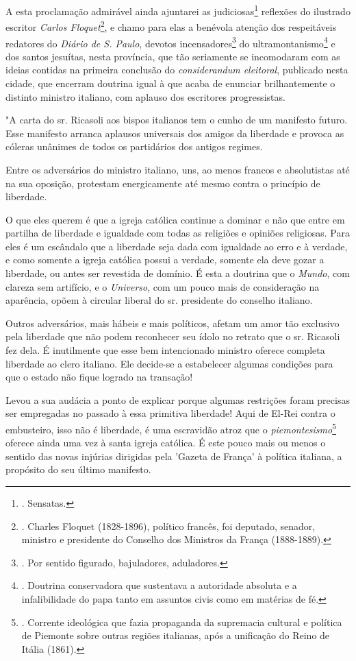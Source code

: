 A esta proclamação admirável ainda ajuntarei as judiciosas\footnote{.
  Sensatas.} reflexões do ilustrado escritor \emph{Carlos
Floquet}\footnote{. Charles Floquet (1828-1896), político francês, foi
  deputado, senador, ministro e presidente do Conselho dos Ministros da
  França (1888-1889).}, e chamo para elas a benévola atenção dos
respeitáveis redatores do \emph{Diário de S. Paulo}, devotos
incensadores\footnote{. Por sentido figurado, bajuladores, aduladores.}
do ultramontanismo\footnote{. Doutrina conservadora que sustentava a
  autoridade absoluta e a infalibilidade do papa tanto em assuntos civis
  como em matérias de fé.} e dos santos jesuítas, nesta província, que
tão seriamente se incomodaram com as ideias contidas na primeira
conclusão do \emph{considerandum eleitoral}, publicado nesta cidade, que
encerram doutrina igual à que acaba de enunciar brilhantemente o
distinto ministro italiano, com aplauso dos escritores progressistas.

"A carta do sr. Ricasoli aos bispos italianos tem o cunho de um
manifesto futuro. Esse manifesto arranca aplausos universais dos amigos
da liberdade e provoca as cóleras unânimes de todos os partidários dos
antigos regimes.

Entre os adversários do ministro italiano, uns, ao menos francos e
absolutistas até na sua oposição, protestam energicamente até mesmo
contra o princípio de liberdade.

O que eles querem é que a igreja católica continue a dominar e não que
entre em partilha de liberdade e igualdade com todas as religiões e
opiniões religiosas. Para eles é um escândalo que a liberdade seja dada
com igualdade ao erro e à verdade, e como somente a igreja católica
possui a verdade, somente ela deve gozar a liberdade, ou antes ser
revestida de domínio. É esta a doutrina que o \emph{Mundo}, com clareza
sem artifício, e o \emph{Universo}, com um pouco mais de consideração na
aparência, opõem à circular liberal do sr. presidente do conselho
italiano.

Outros adversários, mais hábeis e mais políticos, afetam um amor tão
exclusivo pela liberdade que não podem reconhecer seu ídolo no retrato
que o sr. Ricasoli fez dela. É inutilmente que esse bem intencionado
ministro oferece completa liberdade ao clero italiano. Ele decide-se a
estabelecer algumas condições para que o estado não fique logrado na
transação!

Levou a sua audácia a ponto de explicar porque algumas restrições foram
precisas ser empregadas no passado à essa primitiva liberdade! Aqui de
El-Rei contra o embusteiro, isso não é liberdade, é uma escravidão atroz
que o \emph{piemontesismo}\footnote{. Corrente ideológica que fazia
  propaganda da supremacia cultural e política de Piemonte sobre outras
  regiões italianas, após a unificação do Reino de Itália (1861).}
oferece ainda uma vez à santa igreja católica. É este pouco mais ou
menos o sentido das novas injúrias dirigidas pela 'Gazeta de França' à
política italiana, a propósito do seu último manifesto.


